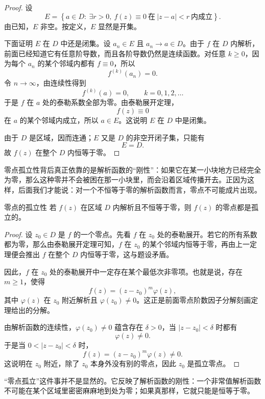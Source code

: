 \begin{proof}
设
\[
    E=\left\{a\in D:\ \exists r>0,\ f(z)\equiv 0\ \text{在}\ |z-a|<r\ \text{内成立}\right\}.
\]
由已知，$E$ 非空。按定义，$E$ 显然是开集。

下面证明 $E$ 在 $D$ 中还是闭集。设 $a_n\in E$ 且 $a_n\to a\in D$。由于 $f$ 在 $D$ 内解析，前面已经知道它有任意阶导数，而且各阶导数仍然是连续函数。对任意 $k\ge 0$，因为每个 $a_n$ 的某个邻域内都有 $f\equiv 0$，所以
\[
    f^{(k)}(a_n)=0.
\]
令 $n\to\infty$，由连续性得到
\[
    f^{(k)}(a)=0,\qquad k=0,1,2,\ldots
\]
于是 $f$ 在 $a$ 处的泰勒系数全部为零。由泰勒展开定理，
\[
    f(z)\equiv 0
\]
在 $a$ 的某个邻域内成立，所以 $a\in E$。这说明 $E$ 在 $D$ 中是闭集。

由于 $D$ 是区域，因而连通；$E$ 又是 $D$ 的非空开闭子集，只能有
\[
    E=D.
\]
故 $f(z)$ 在整个 $D$ 内恒等于零。
\end{proof}

\begin{tishi}[这条局部唯一性为什么放在这里]
零点孤立性背后真正依靠的是解析函数的``刚性''：如果它在某一小块地方已经完全为零，那么这种零并不会被困在那一小块里，而会沿着区域传播开去。正因为这样，后面我们才能说：对一个不恒等于零的解析函数而言，零点不可能成片出现。
\end{tishi}

\begin{dingli}{零点的孤立性}{}
若 $f(z)$ 在区域 $D$ 内解析且不恒等于零，则 $f(z)$ 的零点都是孤立的。
\end{dingli}

\begin{proof}
设 $z_0\in D$ 是 $f$ 的一个零点。先看 $f$ 在 $z_0$ 处的泰勒展开。若它的所有系数都为零，那么由泰勒展开定理可知，$f$ 在 $z_0$ 的某个邻域内恒等于零，再由上一定理便会推出 $f$ 在整个 $D$ 内恒等于零，这与题设矛盾。

因此，$f$ 在 $z_0$ 处的泰勒展开中一定存在某个最低次非零项。也就是说，存在 $m\ge 1$，使得
\[
    f(z)=(z-z_0)^m \varphi(z),
\]
其中 $\varphi(z)$ 在 $z_0$ 附近解析且 $\varphi(z_0)\ne 0$。这正是前面零点阶数因子分解刻画定理给出的分解。

由解析函数的连续性，$\varphi(z_0)\ne 0$ 蕴含存在 $\delta>0$，当 $|z-z_0|<\delta$ 时都有
\[
    \varphi(z)\ne 0.
\]
于是当 $0<|z-z_0|<\delta$ 时，
\[
    f(z)=(z-z_0)^m\varphi(z)\ne 0.
\]
这说明在 $z_0$ 附近，除了 $z_0$ 本身外没有别的零点，因此 $z_0$ 是孤立零点。
\end{proof}

\begin{tishi}[这一定理的意义]
``零点孤立''这件事并不是显然的。它反映了解析函数的刚性：一个非常值解析函数不可能在某个区域里密密麻麻地到处为零；如果真那样，它就只能是恒等于零。
\end{tishi}

